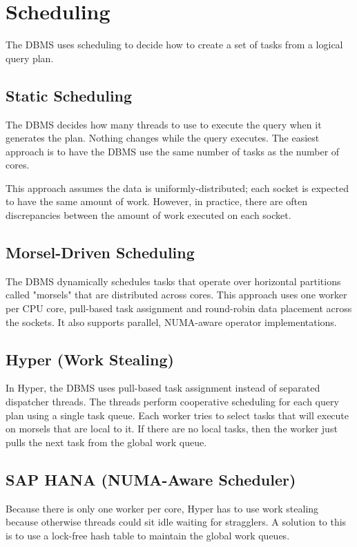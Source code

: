 \documentclass[11pt]{article}
\begin{document}
\section{Scheduling}
The DBMS uses scheduling to decide how to create a set of tasks from a logical query plan.

\subsection*{Static Scheduling}
The DBMS decides how many threads to use to execute the query when it generates the plan. Nothing changes while the query executes. The easiest approach is to have the DBMS use the same number of tasks as the number of cores.

This approach assumes the data is uniformly-distributed; each socket is expected to have the same amount of work. However, in practice, there are often discrepancies between the amount of work executed on each socket.

\subsection*{Morsel-Driven Scheduling}
The DBMS dynamically schedules tasks that operate over horizontal partitions called "morsels" that are distributed across cores. This approach uses one worker per CPU core, pull-based task assignment and round-robin data placement across the sockets. It also supports parallel, NUMA-aware operator implementations.

\subsection*{Hyper (Work Stealing)}
In Hyper, the DBMS uses pull-based task assignment instead of separated dispatcher threads. The threads perform cooperative scheduling for each query plan using a single task queue. Each worker tries to select tasks that will execute on morsels that are local to it. If there are no local tasks, then the worker just pulls the next task from the global work queue.

\subsection*{SAP HANA (NUMA-Aware Scheduler)}
Because there is only one worker per core, Hyper has to use work stealing because otherwise threads could sit idle waiting for stragglers. A solution to this is to use a lock-free hash table to maintain the global work queues.
\end{document}
